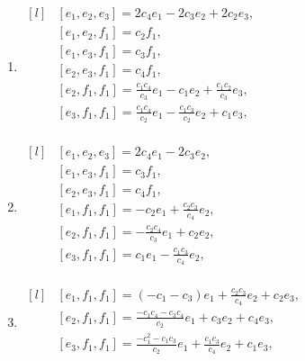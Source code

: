 \begin{enumerate}
    \item $\begin{matrix*}[l]
            & [e_1, e_2, e_3] = 2 c_{4} e_1 - 2 c_{3} e_2 + 2 c_{2} e_3, \\
            & [e_1, e_2, f_1] = c_{2} f_1, \\
            & [e_1, e_3, f_1] = c_{3} f_1, \\
            & [e_2, e_3, f_1] = c_{4} f_1, \\
            & [e_2, f_1, f_1] = \frac{c_{1} c_{4}}{c_{3}} e_1 - c_{1} e_2 + \frac{c_{1} c_{2}}{c_{3}} e_3, \\
            & [e_3, f_1, f_1] = \frac{c_{1} c_{4}}{c_{2}} e_1 - \frac{c_{1} c_{3}}{c_{2}} e_2 + c_{1} e_3, \\
        \end{matrix*}$

    \item $\begin{matrix*}[l]
            & [e_1, e_2, e_3] = 2 c_{4} e_1 - 2 c_{3} e_2 , \\
            & [e_1, e_3, f_1] = c_{3} f_1, \\
            & [e_2, e_3, f_1] = c_{4} f_1, \\
            & [e_1, f_1, f_1] = -c_{2} e_1 + \frac{c_{2} c_{3}}{c_{4}} e_2 , \\
            & [e_2, f_1, f_1] = -\frac{c_{2} c_{4}}{c_{3}} e_1 + c_{2} e_2 , \\
            & [e_3, f_1, f_1] = c_{1} e_1 - \frac{c_{1} c_{3}}{c_{4}} e_2 , \\
        \end{matrix*}$

    \item $\begin{matrix*}[l]
            & [e_1, f_1, f_1] = \left(-c_{1} - c_{3}\right) e_1 + \frac{c_{2} c_{3}}{c_{4}} e_2 + c_{2} e_3, \\
            & [e_2, f_1, f_1] = \frac{-c_{1} c_{4} - c_{3} c_{4}}{c_{2}} e_1 + c_{3} e_2 + c_{4} e_3, \\
            & [e_3, f_1, f_1] = \frac{-c_{1}^2 - c_{1} c_{3}}{c_{2}} e_1 + \frac{c_{1} c_{3}}{c_{4}} e_2 + c_{1} e_3, \\
        \end{matrix*}$
\end{enumerate}

